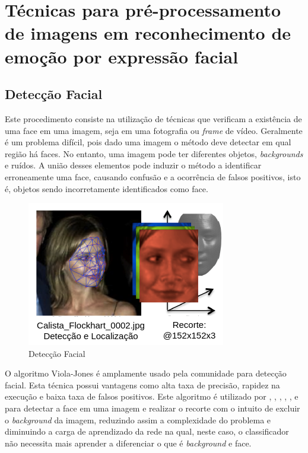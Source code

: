 \section{Técnicas para pré-processamento de imagens em reconhecimento de emoção por expressão facial}\label{sec:tecnic}
\subsection{Detecção Facial}\label{sec:detecfacialviola}
Este procedimento consiste na utilização de técnicas que verificam a existência de uma face em uma imagem, seja em uma fotografia ou \textit{frame} de vídeo. Geralmente é um problema difícil, pois dado uma imagem o método deve detectar em qual região há faces. No entanto, uma imagem pode ter diferentes objetos, \textit{backgrounds} e ruídos. A união desses elementos pode induzir o método a identificar erroneamente uma face, causando confusão e a ocorrência de falsos positivos, isto é, objetos sendo incorretamente identificados como face.

\begin{figure}
\centering
\includegraphics[scale=0.75]{figuras/detectface.png}
\caption{Detecção Facial}
\label{fig:detectface}
\end{figure}


O algoritmo Viola-Jones \citep{viola2001rapid} é amplamente usado pela comunidade para detecção facial. Esta técnica possui vantagens como alta taxa de precisão, rapidez na execução e baixa taxa de falsos positivos. Este algoritmo é utilizado por \cite{art1}, \cite{art2}, \cite{art6}, \cite{art9}, \cite{art12}, \cite{art13} e \cite{art15} para detectar a face em uma imagem e realizar o recorte com o intuito de excluir o \textit{background} da imagem, reduzindo assim a complexidade do problema e diminuindo a carga de aprendizado da rede na qual, neste caso, o classificador não necessita mais aprender a diferenciar o que é \textit{background} e face.

